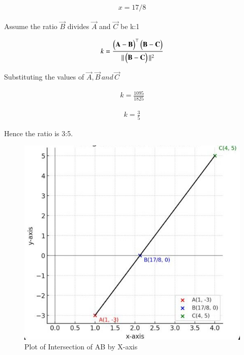 \documentclass[journal,12pt,onecolumn]{IEEEtran}
\theoremstyle{remark}
\begin{document}
\begin{align}
    x = 17/8
\end{align}


Assume the ratio $\vec{B}$ divides $\vec{A}$  and $\vec{C}$ be k:1

\begin{align}
    k = \frac{\begin{pmatrix}\mathbf{A} - \mathbf{B}\end{pmatrix}^\top \begin{pmatrix}\mathbf{B} - \mathbf{C}\end{pmatrix}}{||\begin{pmatrix}\mathbf{B} - \mathbf{C}\end{pmatrix}||^2}
\end{align}

Substituting the values of $\vec{A}, \vec{B} \, and \, \vec{C}$

\begin{align}
    k = \frac{1095}{1825}
\end{align}

\begin{align}
    k = \frac{3}{5}
\end{align}

\centering
\begin{large}Hence the ratio is 3:5.\end{large}

\vspace{0.5cm}
\begin{figure}[H]
\centering
\includegraphics[width=0.8\columnwidth]{figs/graph.png}
 \caption*{Plot of Intersection of AB by X-axis}
\label{fig:graph.png}
\end{figure}
\end{document}
